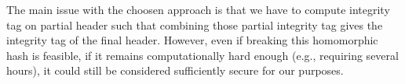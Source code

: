 The main issue with the choosen approach is that we have to compute integrity tag on partial header such 
that combining those partial integrity tag gives the integrity tag of the final header.
However, even if breaking this homomorphic hash is feasible, if it remains computationally hard enough (e.g., requiring several hours), it could still be considered sufficiently secure for our purposes.




